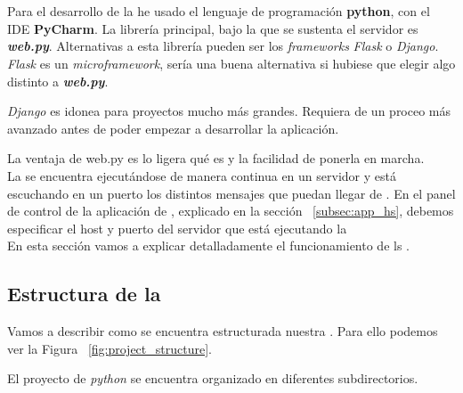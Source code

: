 \section{\iface{}}


Para el desarrollo de la \iface{} he usado el lenguaje de programación \textbf{python}, con el IDE \textbf{PyCharm}. La librería principal, bajo la que se sustenta el servidor es \textbf{\textit{web.py}}.
Alternativas a esta librería pueden ser los \textit{frameworks} \textit{Flask} o \textit{Django}.
\textit{Flask} es un \textit{microframework}, sería una buena alternativa si hubiese que elegir algo distinto a  \textbf{\textit{web.py}}.

\textit{Django} es idonea para proyectos mucho más grandes. Requiera de un proceo más avanzado antes de poder empezar a desarrollar la aplicación.

La ventaja de web.py es lo ligera qué es y la facilidad de ponerla en marcha.\\

La \iface{} se encuentra ejecutándose de manera continua en un servidor y está escuchando en un puerto los distintos mensajes que puedan llegar de \hs.
En el panel de control de la aplicación de \hs{}, explicado en la sección ~\ref{subsec:app_hs}, debemos especificar el host y puerto del servidor que está ejecutando la \iface{}\\


En esta sección vamos a explicar detalladamente el funcionamiento de ls \iface{}.

\subsection{Estructura de la \iface{}}
Vamos a describir como se encuentra estructurada nuestra \iface. Para ello podemos ver la Figura ~\ref{fig:project_structure}. 

El proyecto de \textit{python} se encuentra organizado en diferentes subdirectorios.

